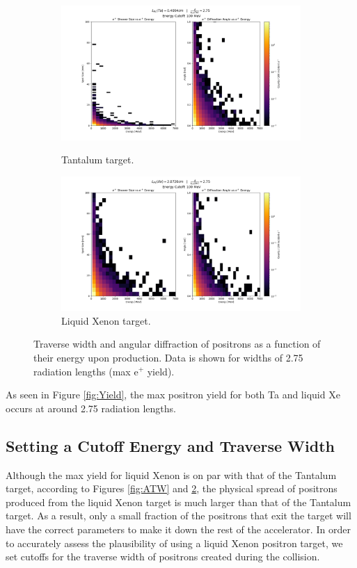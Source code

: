 \documentclass[%
reprint,
amsmath, amssymb,
aps,
floatfix,
]{revtex4-2}
\begin{document}
\begin{figure}[H]
    \begin{subfigure}{.5\textwidth}
        \includegraphics[height = .5\linewidth]{../images/TaHists.png}
        \caption{\label{fig:TaHists}Tantalum target.}
        \includegraphics[height = .5\linewidth]{../images/XeHists.png}
        \caption{\label{fig:XeHists}Liquid Xenon target.}
    \end{subfigure}
    \caption{\label{fig:Hists}Traverse width and angular diffraction of positrons as a function
    of their energy upon production.  Data is shown for widths of 2.75 radiation lengths (max e$^+$ yield).}
\end{figure}

As seen in Figure \ref{fig:Yield}, the max positron yield for both Ta and liquid Xe occurs at around 2.75 radiation lengths.

\subsection{Setting a Cutoff Energy and Traverse Width}
Although the max yield for liquid Xenon is on par with that of the Tantalum target,
according to Figures \ref{fig:ATW} and \ref{fig:Hists}, the physical spread of positrons produced
from the liquid Xenon target is much larger than that of the Tantalum target.  As a result, only a small
fraction of the positrons that exit the target will have the correct parameters to make it down the rest of
the accelerator.  In order to accurately assess the plausibility of using a liquid Xenon positron target,
we set cutoffs for the traverse width of positrons created during the collision.
\end{document}

